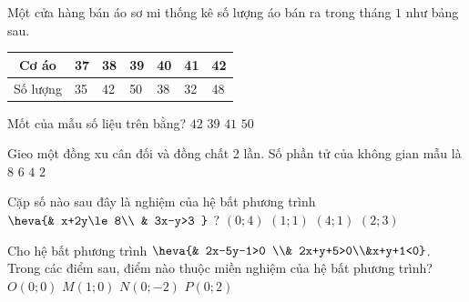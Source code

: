 
\begin{ex}%
	Một cửa hàng bán áo sơ mi thống kê  số lượng áo bán ra trong tháng $ 1 $ như bảng sau.
	\begin{center}
		\begin{tabular}{|c|l|l|l|l|l|l|}
			\hline Cơ áo & 37 & 38 & 39 & 40 & 41 &  42 \\
			\hline Số lượng & 35 & 42 & 50  & 38 & 32 & 48 \\
			\hline 
		\end{tabular}
	\end{center}
	Mốt của mẫu số liệu trên  bằng?
	\choice 
		 {$ 42 $}
		{$ 39 $} 
		 {$ 41 $}
		{\True $  50 $}
\end{ex}

\begin{ex}%
	Gieo một đồng xu cân đối và đồng chất 2 lần. Số phần tử của không gian mẫu là 
	\choice 
		{$  8 $}
		{$  6 $}
		{\True  $ 4 $}
		{$ 2 $ } 
\end{ex}

\begin{ex}%
	Cặp số nào sau đây là nghiệm của hệ  bất phương trình $\heva{& x+2y\le8\\ & 3x-y>3 }$ ?
	\choice 
		 {$\left(0; 4\right)$ }
		 {$\left(1; 1\right)$}
		 {\True $\left(4; 1\right)$}
		{$\left(2;  3\right)$}
\end{ex}

\begin{ex}%
	Cho hệ bất phương  trình $\heva{& 2x-5y-1>0 \\& 2x+y+5>0\\&x+y+1<0}$. Trong các điểm sau, điểm nào thuộc miền nghiệm của hệ bất phương trình?
	\choice 
		 {$O\left(0;0\right)$}
		 {$M\left(1;0\right)$}
		{\True  $N\left(0;-2\right)$}
		 {$P\left(0;2\right)$}
\end{ex}

